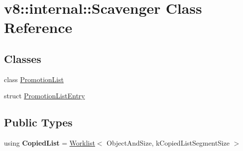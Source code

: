 \hypertarget{classv8_1_1internal_1_1Scavenger}{}\section{v8\+:\+:internal\+:\+:Scavenger Class Reference}
\label{classv8_1_1internal_1_1Scavenger}
\subsection*{Classes}
\begin{DoxyCompactItemize}
\item 
class \mbox{\hyperlink{classv8_1_1internal_1_1Scavenger_1_1PromotionList}{Promotion\+List}}
\item 
struct \mbox{\hyperlink{structv8_1_1internal_1_1Scavenger_1_1PromotionListEntry}{Promotion\+List\+Entry}}
\end{DoxyCompactItemize}
\subsection*{Public Types}
\begin{DoxyCompactItemize}
\item 
\mbox{\label{classv8_1_1internal_1_1Scavenger_a5977f775d239e658dcc55b63bdc18bb4}} 
using {\bfseries Copied\+List} = \mbox{\hyperlink{classv8_1_1internal_1_1Worklist}{Worklist}}$<$ Object\+And\+Size, k\+Copied\+List\+Segment\+Size $>$
\end{DoxyCompactItemize}
